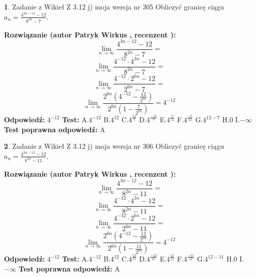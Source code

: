 \documentclass[12pt, a4paper]{article}
\theoremstyle{definition} %
\newtheorem{zad}{}
\newcommand{\zadStart}[1]{\begin{zad}#1\newline}
\newcommand{\zadStop}{\end{zad}}
\newcommand{\rozwStart}[2]{\noindent \textbf{Rozwiązanie (autor #1 , recenzent #2): }\newline}
\newcommand{\rozwStop}{\newline}
\newcommand{\odpStart}{\noindent \textbf{Odpowiedź:}\newline}
\newcommand{\odpStop}{\newline}
\newcommand{\testStart}{\noindent \textbf{Test:}\newline}
\newcommand{\testStop}{\newline}
\newcommand{\kluczStart}{\noindent \textbf{Test poprawna odpowiedź:}\newline}
\newcommand{\kluczStop}{\newline}
\begin{document}
\zadStart{Zadanie z Wikieł Z 3.12 j) moja wersja nr 305}
Obliczyć granicę ciągu $a_{n}=\frac{4^{3n-12}-12}{8^{2n}-7}$.
\zadStop
\rozwStart{Patryk Wirkus}{}
$$\lim\limits_{n\to\infty}\frac{4^{3n-12}-12}{8^{2n}-7}=$$
$$\lim\limits_{n\to\infty}\frac{4^{-12} \cdot 4^{3n}-12}{8^{2n}-7}=$$
$$\lim\limits_{n\to\infty}\frac{4^{-12} \cdot 2^{6n}-12}{2^{6n}-7}=$$
$$\lim\limits_{n\to\infty}\frac{2^{6n}(4^{-12} - \frac{12}{2^{6n}})}{2^{6n}(1-\frac{7}{2^{6n}})}= 4^{-12}$$
\rozwStop
\odpStart
$4^{-12}$
\odpStop
\testStart
A.$4^{-12}$
B.$4^{12}$
C.$4^{\frac{12}{7}}$
D.$4^{\frac{-12}{7}}$
E.$4^{\frac{7}{12}}$
F.$4^{\frac{-7}{12}}$
G.$4^{12-7}$
H.$0$
I.$-\infty$
\testStop
\kluczStart
A
\kluczStop



\zadStart{Zadanie z Wikieł Z 3.12 j) moja wersja nr 306}
Obliczyć granicę ciągu $a_{n}=\frac{4^{3n-12}-12}{8^{2n}-11}$.
\zadStop
\rozwStart{Patryk Wirkus}{}
$$\lim\limits_{n\to\infty}\frac{4^{3n-12}-12}{8^{2n}-11}=$$
$$\lim\limits_{n\to\infty}\frac{4^{-12} \cdot 4^{3n}-12}{8^{2n}-11}=$$
$$\lim\limits_{n\to\infty}\frac{4^{-12} \cdot 2^{6n}-12}{2^{6n}-11}=$$
$$\lim\limits_{n\to\infty}\frac{2^{6n}(4^{-12} - \frac{12}{2^{6n}})}{2^{6n}(1-\frac{11}{2^{6n}})}= 4^{-12}$$
\rozwStop
\odpStart
$4^{-12}$
\odpStop
\testStart
A.$4^{-12}$
B.$4^{12}$
C.$4^{\frac{12}{11}}$
D.$4^{\frac{-12}{11}}$
E.$4^{\frac{11}{12}}$
F.$4^{\frac{-11}{12}}$
G.$4^{12-11}$
H.$0$
I.$-\infty$
\testStop
\kluczStart
A
\kluczStop
\end{document}
